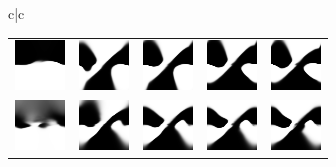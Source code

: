\begin{figure}[!ht]
\begin{tabular}{c|c}
\begin{tabular}{lllll}
			\includegraphics[width=\iw]{figs_data/pendulum/0.005/au_act_4.png} &\includegraphics[width=\iw]{figs_data/pendulum/0.005/au_act_8.png} &\includegraphics[width=\iw]{figs_data/pendulum/0.005/au_act_12.png} &\includegraphics[width=\iw]{figs_data/pendulum/0.005/au_act_16.png} &\includegraphics[width=\iw]{figs_data/pendulum/0.005/au_act_20.png} \\
			\includegraphics[width=\iw]{figs_data/pendulum/0.002/au_act_10.png} &\includegraphics[width=\iw]{figs_data/pendulum/0.002/au_act_20.png} &\includegraphics[width=\iw]{figs_data/pendulum/0.002/au_act_30.png} &\includegraphics[width=\iw]{figs_data/pendulum/0.002/au_act_40.png} &\includegraphics[width=\iw]{figs_data/pendulum/0.002/au_act_50.png} \\

\end{tabular}
\end{tabular}
\end{figure}
